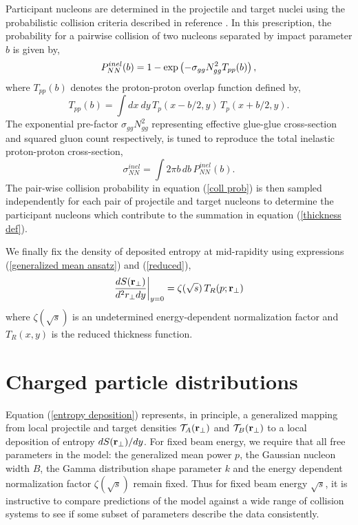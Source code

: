 \documentclass[aps,prl,reprint,amsmath,nofootinbib]{revtex4-1}
\begin{document}
Participant nucleons are determined in the projectile and target nuclei using the probabilistic collision criteria described in reference \cite{proton-proton}. In this prescription, the 
probability for a pairwise collision of two nucleons separated by impact parameter $b$ is given by,
\begin{equation}
  \label{coll prob}
  P^{inel}_{NN}(b) = 1 - \exp \left(-\sigma_{gg} N_{gg}^2 T_{pp}(b) \right), \\[1ex]
\end{equation}
where $T_{pp}(b)$ denotes the proton-proton overlap function defined by,
\begin{equation}
 T_{pp}(b) = \int dx~dy \,T_p(x-b/2,y) \,T_p(x+b/2,y).
\end{equation}
The exponential pre-factor $\sigma_{gg} N_{gg}^2$ representing effective glue-glue cross-section and squared gluon count respectively, is tuned to reproduce the total 
inelastic proton-proton cross-section,
\begin{equation}
  \sigma^{inel}_{NN} = \int 2 \pi b \,db \, P_{NN}^{inel}(b).
\end{equation}
The pair-wise collision probability in equation (\ref{coll prob}) is then sampled independently for each pair of projectile and target nucleons to determine the participant nucleons 
which contribute to the summation in equation (\ref{thickness def}).

We finally fix the density of deposited entropy at mid-rapidity using expressions (\ref{generalized mean ansatz}) and (\ref{reduced}),
\begin{equation}
 \label{entropy deposition}
 \frac{dS({\bf r}_\perp)}{d^2r_\perp dy} \biggr \rvert_{y=0} = \zeta(\sqrt{s})\, T_R(p;{\bf r}_\perp)
\end{equation}
where $\zeta(\sqrt{s})$ is an undetermined energy-dependent normalization factor and $T_R(x,y)$ is the reduced thickness function.

\section{Charged particle distributions}

Equation (\ref{entropy deposition}) represents, in principle, a generalized mapping from local projectile and target densities $\mathcal{T}_A ({\bf r}_\perp)$ and 
$\mathcal{T}_B({\bf r}_\perp)$ to a local deposition of entropy $dS({\bf r}_\perp)/dy$. For fixed beam energy, we require that all free parameters in the model: 
the generalized mean power $p$, the Gaussian nucleon width $B$, the Gamma distribution shape parameter $k$ and the energy dependent normalization factor 
$\zeta(\sqrt{s})$ remain fixed. Thus for fixed beam energy $\sqrt{s}$, it is instructive to compare predictions of the model against a wide range of collision systems to see if some subset of 
parameters describe the data consistently.
\end{document}
